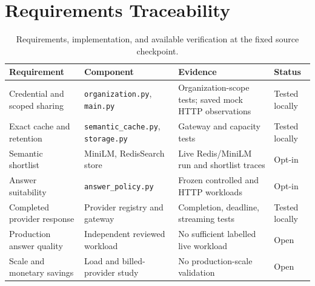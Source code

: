 \section{Requirements Traceability}
\begin{table}[htbp]\centering\small
\caption{Requirements, implementation, and available verification at the fixed source checkpoint.}\label{tab:requirements}
\begin{tabular}{p{2.8cm}p{3.5cm}p{4.1cm}p{2.2cm}}\toprule
Requirement & Component & Evidence & Status \\\midrule
Credential and scoped sharing & \texttt{organization.py}, \texttt{main.py} & Organization-scope tests; saved mock HTTP observations & Tested locally \\
Exact cache and retention & \texttt{semantic\_cache.py}, \texttt{storage.py} & Gateway and capacity tests & Tested locally \\
Semantic shortlist & MiniLM, RedisSearch store & Live Redis/MiniLM run and shortlist traces & Opt-in \\
Answer suitability & \texttt{answer\_policy.py} & Frozen controlled and HTTP workloads & Opt-in \\
Completed provider response & Provider registry and gateway & Completion, deadline, streaming tests & Tested locally \\
Production answer quality & Independent reviewed workload & No sufficient labelled live workload & Open \\
Scale and monetary savings & Load and billed-provider study & No production-scale validation & Open \\\bottomrule
\end{tabular}
\end{table}


